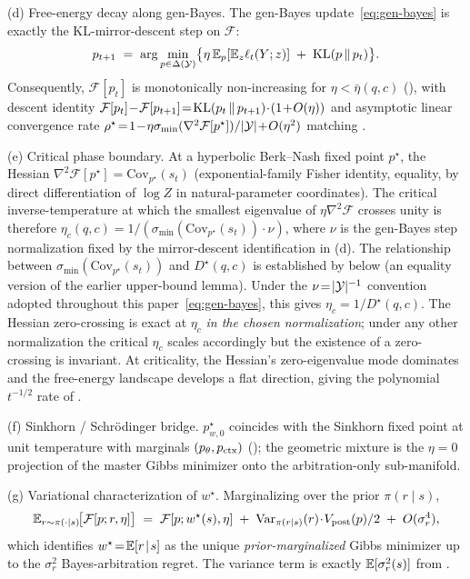 \begin{theorem}
\textup{(d) Free-energy decay along gen-Bayes.}  The gen-Bayes
update~\eqref{eq:gen-bayes} is exactly the KL-mirror-descent step
on $\mathcal{F}$:
\[
p_{t+1}\;=\;\arg\min_{p\in\Delta(\mathcal{Y})}\bigl\{\eta\,\mathbb{E}_p[\mathbb{E}_z\ell_t(Y;z)]\;+\;\operatorname{KL}(p\,\|\,p_t)\bigr\}.
\]
Consequently, $\mathcal{F}[p_t]$ is monotonically non-increasing
for $\eta\!<\!\bar\eta(q,c)$ (), with
descent identity
$\mathcal{F}[p_t]\!-\!\mathcal{F}[p_{t+1}]\!=\!\KL(p_t\,\|\,p_{t+1})\!\cdot\!(1\!+\!O(\eta))$
and asymptotic linear convergence rate
$\rho^\star\!=\!1\!-\!\eta\sigma_{\min}(\nabla^{2}\mathcal{F}[p^\star])/|\mathcal{Y}|\!+\!O(\eta^{2})$
matching .

\textup{(e) Critical phase boundary.}  At a hyperbolic Berk--Nash
fixed point $p^\star$, the Hessian
$\nabla^{2}\mathcal{F}[p^\star]\!=\!\mathrm{Cov}_{p^\star}(s_t)$
(exponential-family Fisher identity, equality, by direct
differentiation of $\log Z$ in natural-parameter coordinates).
The critical inverse-temperature at which the smallest eigenvalue
of $\eta\nabla^{2}\mathcal{F}$ crosses unity is therefore
$\eta_c(q,c)\!=\!1/(\sigma_{\min}(\mathrm{Cov}_{p^\star}(s_t))\!\cdot\!\nu)$,
where $\nu$ is the gen-Bayes step normalization fixed by the
mirror-descent identification in (d).  The relationship between
$\sigma_{\min}(\mathrm{Cov}_{p^\star}(s_t))$ and $D^\star(q,c)$
is established by  below
(an equality version of the earlier upper-bound lemma).
Under the $\nu\!=\!|\mathcal{Y}|^{-1}$ convention adopted throughout this
paper~\eqref{eq:gen-bayes}, this gives
$\eta_c\!=\!1/D^\star(q,c)$.  The Hessian zero-crossing is exact
at $\eta_c$ \emph{in the chosen normalization}; under any other
normalization the critical $\eta_c$ scales accordingly but the
existence of a zero-crossing is invariant.  At criticality, the
Hessian's zero-eigenvalue mode dominates and the free-energy
landscape develops a flat direction, giving the polynomial
$t^{-1/2}$ rate of .

\textup{(f) Sinkhorn / Schr\"odinger bridge.}  $p^\star_{w,0}$
coincides with the Sinkhorn fixed point at unit temperature with
marginals $(p_\theta, p_{\mathrm{ctx}})$
(); the geometric mixture is the
$\eta\!=\!0$ projection of the master Gibbs minimizer onto the
arbitration-only sub-manifold.

\textup{(g) Variational characterization of $w^\star$.}
Marginalizing over the prior $\pi(r\!\mid\!s)$,
\[
\mathbb{E}_{r\sim\pi(\cdot\mid s)}\!\bigl[\mathcal{F}[p;r,\eta]\bigr]
\;=\;
\mathcal{F}[p;w^\star(s),\eta]\;+\;\operatorname{Var}_{\pi(r\mid s)}(r)\!\cdot\!V_{\mathrm{post}}(p)/2\;+\;O(\sigma_r^{4}),
\]
which identifies $w^\star\!=\!\mathbb{E}[r\!\mid\!s]$ as the unique
\emph{prior-marginalized} Gibbs minimizer up to the
$\sigma_r^{2}$ Bayes-arbitration regret.  The variance term is
exactly $\mathbb{E}[\sigma_r^{2}(s)]$ from .
\end{theorem}


